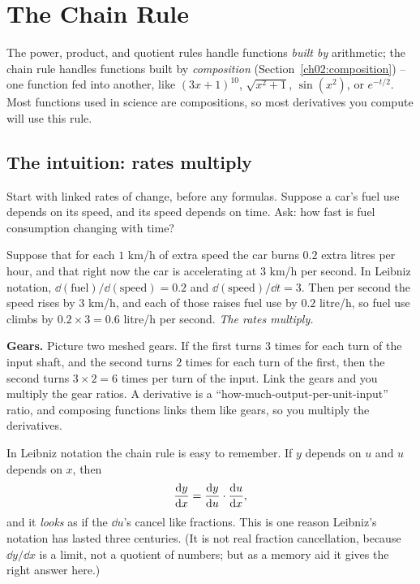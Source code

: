 \section{The Chain Rule}
\label{ch11:chain-rule}

The power, product, and quotient rules handle functions \emph{built by} arithmetic; the
chain rule handles functions built by \emph{composition} (Section~\ref{ch02:composition}) -- one function
fed into another, like $(3x+1)^{10}$, $\sqrt{x^2+1}$, $\sin(x^2)$, or $e^{-t/2}$. Most
functions used in science are compositions, so most derivatives you compute will use
this rule.

\subsection{The intuition: rates multiply}

Start with linked rates of change, before any formulas. Suppose a
car's fuel use depends on its speed, and its speed depends on time. Ask: how fast is fuel
consumption changing with time?

Suppose that for each $1$ km/h of extra speed the car burns $0.2$ extra litres per hour,
and that right now the car is accelerating at $3$ km/h per second. In Leibniz notation,
$\dd(\text{fuel})/\dd(\text{speed}) = 0.2$ and $\dd(\text{speed})/\dd t = 3$. Then per
second the speed rises by $3$ km/h, and each of
those raises fuel use by $0.2$ litre/h, so fuel use climbs by $0.2 \times 3 = 0.6$ litre/h
per second. \emph{The rates multiply.}

\begin{intuitionbox}
\textbf{Gears.} Picture two meshed gears. If the first turns $3$ times for each turn of
the input shaft, and the second turns $2$ times for each turn of the first, then the
second turns $3\times 2 = 6$ times per turn of the input. Link the gears and you
multiply the gear ratios. A derivative is a ``how-much-output-per-unit-input'' ratio,
and composing functions links them like gears, so you multiply the derivatives.
\end{intuitionbox}

In Leibniz notation the chain rule is easy to remember. If $y$ depends on $u$ and $u$
depends on $x$, then
\[
  \frac{\mathrm{d} y}{\mathrm{d} x} = \frac{\mathrm{d} y}{\mathrm{d} u}\cdot\frac{\mathrm{d} u}{\mathrm{d} x},
\]
and it \emph{looks} as if the $\dd u$'s cancel like fractions. This is one reason
Leibniz's notation has lasted three centuries. (It is not real fraction cancellation,
because $\dd y/\dd x$ is a limit, not a quotient of numbers; but as a memory aid it
gives the right answer here.)

